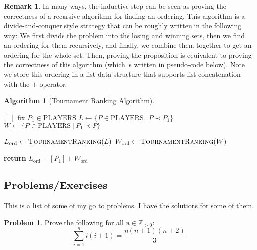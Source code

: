 \documentclass{article}
\theoremstyle{plain}
\theoremstyle{definition}
\newtheorem{problem}{Problem}[section]
\newtheorem{remark}[theorem]{Remark}
\newtheorem{algorithm}[theorem]{Algorithm}
\newcommand{\ZZZ}{\mathbb{Z}_{> 0}}
\begin{document}
\begin{remark}
    In many ways, the inductive step can be seen as proving the correctness of a recursive algorithm for finding an ordering. This algorithm is a divide-and-conquer style strategy that can be roughly written in the following way: We first divide the problem into the losing and winning sets, then we find an ordering for them recursively, and finally, we combine them together to get an ordering for the whole set. Then, proving the proposition is equivalent to proving the correctness of this algorithm (which is written in pseudo-code below). Note we store this ordering in a list data structure that supports list concatenation with the \(+\) operator.
    \begin{algorithm}[Tournament Ranking Algorithm] \phantom{}\label{alg_tourn_ranking}
    
    \begin{center}
    \begin{minipage}{.5\linewidth}
    \begin{algorithmic}[1]
                \Return \([\;]\)
            \Else
                \State fix \(P_1 \in \text{PLAYERS}\)
                \State \(L \leftarrow \{P \in \text{PLAYERS}\ |\ P \prec P_1\}\)
                \State \(W \leftarrow \{P \in \text{PLAYERS}\ |\ P_1 \prec P\}\)

                \State \(L_{\text{ord}} \leftarrow \textsc{TournamentRanking}(L)\)
                \State \(W_{\text{ord}} \leftarrow \textsc{TournamentRanking}(W)\)
                
                \State \textbf{return} \(L_{\text{ord}} + [P_1] + W_{\text{ord}}\)
            \EndIf 
        \EndProcedure
    \end{algorithmic}
    \end{minipage}
    \end{center}
    \end{algorithm}
\end{remark}

\subsection{Problems/Exercises}

This is a list of some of my go to problems. I have the solutions for some of them.

\begin{problem}
    Prove the following for all \(n \in \ZZZ\):
    \[\sum_{i=1}^n i (i+1) = \frac{n(n+1)(n+2)}{3}\]
\end{problem}
\end{document}
